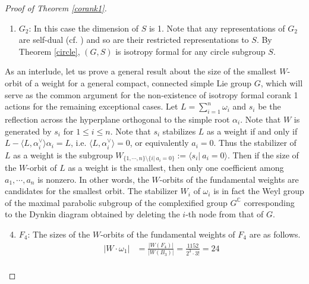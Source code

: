 \documentclass[11pt]{amsart}
\theoremstyle{plain}
\theoremstyle{definition}
\begin{document}
\begin{proof}[Proof of Theorem \ref{corank1}]
\begin{enumerate}
	\item $G_2$: In this case the dimension of $S$ is 1. Note that any representations of $G_2$ are self-dual (cf. \cite{Bo}) and so are their restricted representations to $S$. By Theorem \ref{circle}, $(G, S)$ is isotropy formal for any circle subgroup $S$.
	\end{enumerate}
	As an interlude, let us prove a general result about the size of the smallest $W$-orbit of a weight for a general compact, connected simple Lie group $G$, which will serve as the common argument for the non-existence of isotropy formal corank 1 actions for the remaining exceptional cases. Let $\displaystyle L=\sum_{i=1}^n\omega_i$ and $s_i$ be the reflection across the hyperplane orthogonal to the simple root $\alpha_i$. Note that $W$ is generated by $s_i$ for $1\leq i\leq n$. Note that $s_i$ stabilizes $L$ as a weight if and only if $L-\langle L, \alpha_i^\vee\rangle\alpha_i=L$, i.e. $\langle L, \alpha_i^\vee\rangle=0$, or equivalently $a_i=0$. Thus the stabilizer of $L$ as a weight is the subgroup $W_{\{1, \cdots, n\}\setminus\{i|\ a_i=0\}}:=\langle s_i|\ a_i=0\rangle$. Then if the size of the $W$-orbit of $L$ as a weight is the smallest, then only one coefficient among $a_1, \cdots, a_n$ is nonzero. In other words, the $W$-orbits of the fundamental weights are candidates for the smallest orbit. The stabilizer $W_{i}$ of $\omega_i$ is in fact the Weyl group of the maximal parabolic subgroup of the complexified group $G^\mathbb{C}$ corresponding to the Dynkin diagram obtained by deleting the $i$-th node from that of $G$. 
	\begin{enumerate}
		\setcounter{enumi}{3}
		\item $F_4$: The sizes of the $W$-orbits of the fundamental weights of $F_4$ are as follows.
		\begin{align*}
			|W\cdot\omega_1|&=\frac{|W(F_4)|}{|W(B_3)|}=\frac{1152}{2^3\cdot 3!}=24\\

\end{align*}
\end{enumerate}
\end{proof}
\end{document}
